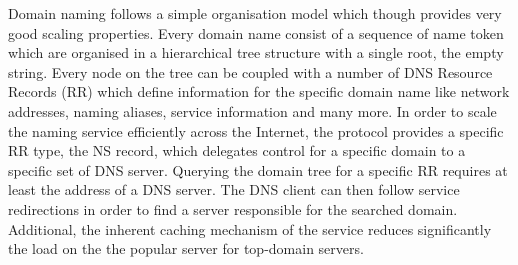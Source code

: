 Domain naming follows a simple organisation model which though provides very
good scaling properties. Every domain name consist of a sequence of name token
which are organised in a hierarchical tree structure with a single root, the
empty string. Every node on the tree can be coupled with a number of DNS
Resource Records (RR) which define information for the specific domain name like
network addresses, naming aliases, service information and many more. In order
to scale the naming service efficiently across the Internet, the protocol
provides a specific RR type, the NS record, which delegates control for a
specific domain to a specific set of DNS server. Querying the domain tree for a
specific RR requires at least the address of a DNS server. The DNS client can
then follow service redirections in order to find a server responsible for the
searched domain.  Additional, the inherent caching mechanism of the service
reduces significantly the load on the the popular server for top-domain servers.



